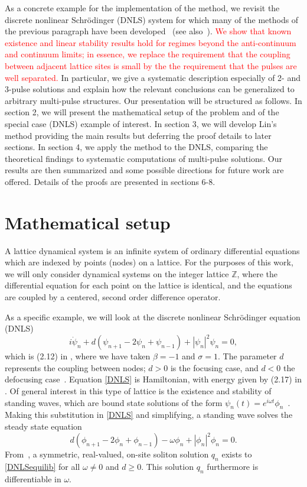 \documentclass[12pt]{elsarticle}
\def\Z{{\mathbb Z}}
\newcommand{\revised}[1]{ \textcolor{red}{#1} }
\begin{document}
As a concrete example for the implementation of the method, we revisit the discrete nonlinear Schr{\"o}dinger (DNLS) system for which many of the methods of the previous paragraph have been developed~\cite{Kevrekidis2009} (see also~\cite{pelinovsky_2011}). \revised{We show that known existence and linear stability results hold for regimes beyond the anti-continuum and continuum limits; in essence, we replace the requirement that the coupling between adjacent lattice sites is small by the the requirement that the pulses are well separated.} In particular, we give a systematic description especially of 2- and 3-pulse solutions and explain how the relevant conclusions can be generalized to arbitrary multi-pulse structures. Our presentation will be structured as follows. In section 2, we will present the mathematical setup of the problem and of the special case (DNLS) example of interest. In section 3, we will develop Lin's method providing the main results but deferring the proof details to later sections. In section 4, we apply the method to the DNLS, comparing the theoretical findings to systematic computations of multi-pulse solutions. Our results are then summarized and some possible directions for future work are offered. Details of the proofs are presented in sections 6-8.

\section{Mathematical setup}

A lattice dynamical system is an infinite system of ordinary differential equations which are indexed by points (nodes) on a lattice. For the purposes of this work, we will only consider dynamical systems on the integer lattice $\Z$, where the differential equation for each point on the lattice is identical, and the equations are coupled by a centered, second order difference operator.

As a specific example, we will look at the discrete nonlinear Schr{\"o}dinger equation (DNLS)
\begin{equation}\label{DNLS}
i\dot{\psi}_n + d(\psi_{n+1} - 2 \psi_n + \psi_{n-1}) + |\psi_n|^2 \psi_n = 0,
\end{equation}
which is (2.12) in \cite{Kevrekidis2009}, where we have taken $\beta = -1$ and $\sigma = 1$. The parameter $d$ represents the coupling between nodes; $d > 0$ is the focusing case, and $d < 0$ the defocusing case~\cite{Kevrekidis2009}. Equation \cref{DNLS} is Hamiltonian, with energy given by (2.17) in \cite{Kevrekidis2009,pelinovsky_2011}. Of general interest in this type of lattice is the existence and stability of standing waves, which are bound state solutions of the form $\psi_n(t) = e^{i \omega t}\phi_n$~\cite{alfimov}. Making this substitution in \cref{DNLS} and simplifying, a standing wave solves the steady state equation
\begin{equation}\label{DNLSequilib}
d(\phi_{n+1} - 2 \phi_n + \phi_{n-1}) - \omega \phi_n + |\phi_n|^2 \phi_n = 0.
\end{equation}
From~\cite{herrmann_2011}, a symmetric, real-valued, on-site soliton solution $q_n$ exists to \cref{DNLSequilib} for all $\omega \neq 0$ and $d \geq 0$. This solution $q_n$ furthermore is differentiable in $\omega$. 
\end{document}
